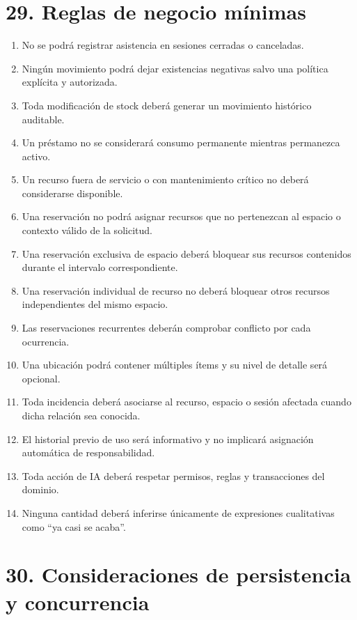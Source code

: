 \documentclass[12pt]{article}
\begin{document}
\section*{29. Reglas de negocio mínimas}

\begin{enumerate}[label=RB\arabic*., leftmargin=1.4cm]
    \item No se podrá registrar asistencia en sesiones cerradas o canceladas.
    \item Ningún movimiento podrá dejar existencias negativas salvo una política explícita y autorizada.
    \item Toda modificación de stock deberá generar un movimiento histórico auditable.
    \item Un préstamo no se considerará consumo permanente mientras permanezca activo.
    \item Un recurso fuera de servicio o con mantenimiento crítico no deberá considerarse disponible.
    \item Una reservación no podrá asignar recursos que no pertenezcan al espacio o contexto válido de la solicitud.
    \item Una reservación exclusiva de espacio deberá bloquear sus recursos contenidos durante el intervalo correspondiente.
    \item Una reservación individual de recurso no deberá bloquear otros recursos independientes del mismo espacio.
    \item Las reservaciones recurrentes deberán comprobar conflicto por cada ocurrencia.
    \item Una ubicación podrá contener múltiples ítems y su nivel de detalle será opcional.
    \item Toda incidencia deberá asociarse al recurso, espacio o sesión afectada cuando dicha relación sea conocida.
    \item El historial previo de uso será informativo y no implicará asignación automática de responsabilidad.
    \item Toda acción de IA deberá respetar permisos, reglas y transacciones del dominio.
    \item Ninguna cantidad deberá inferirse únicamente de expresiones cualitativas como ``ya casi se acaba''.
\end{enumerate}

\section*{30. Consideraciones de persistencia y concurrencia}
\end{document}
